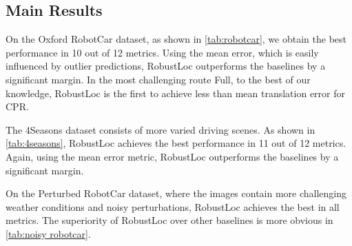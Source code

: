 \documentclass[letterpaper]{article} \usepackage{aaai23}  \usepackage{times}  \usepackage{helvet}  \usepackage{courier}  \usepackage[hyphens]{url}  \usepackage{graphicx} \urlstyle{rm} \def\UrlFont{\rm}  \usepackage{natbib}  \usepackage{caption} \frenchspacing  \setlength{\pdfpagewidth}{8.5in} \setlength{\pdfpageheight}{11in} \usepackage{booktabs}
\theoremstyle{remark}
\theoremstyle{plain}
\begin{document}
\subsection{Main Results}\label{subsec:main results}
On the Oxford RobotCar dataset, as shown in \cref{tab:robotcar}, we obtain the best performance in 10 out of 12 metrics. Using the mean error, which is easily influenced by outlier predictions, RobustLoc outperforms the baselines by a significant margin. In the most challenging route Full, to the best of our knowledge, RobustLoc is the first to achieve less than  mean translation error for CPR.

The 4Seasons dataset consists of more varied driving scenes. As shown in \cref{tab:4seasons}, RobustLoc achieves the best performance in 11 out of 12 metrics. Again, using the mean error metric, RobustLoc outperforms the baselines by a significant margin.

On the Perturbed RobotCar dataset, where the images contain more challenging weather conditions and noisy perturbations, RobustLoc achieves the best in all metrics. The superiority of RobustLoc over other baselines is more obvious in \cref{tab:noisy robotcar}.
\end{document}
